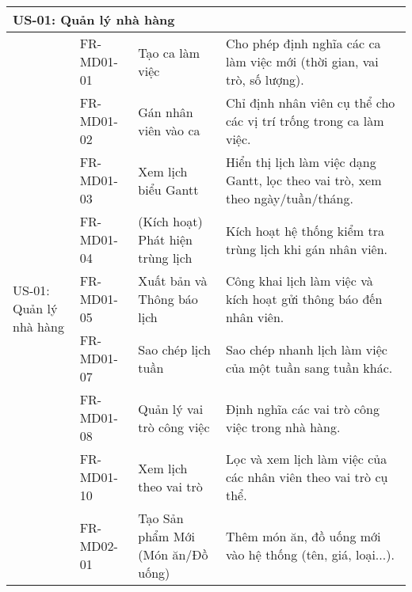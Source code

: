 \begin{longtable}{|m{2.5cm}|m{2.5cm}|m{5cm}|m{5cm}|}
	\multicolumn{4}{|l|}{\textbf{US-01: Quản lý nhà hàng}}                                                                                                                                                                                 \\ \hline
	\multirow{15}{=}[2pt]{US-01: Quản lý nhà hàng}          & FR-MD01-01            & Tạo ca làm việc                                        & Cho phép định nghĩa các ca làm việc mới (thời gian, vai trò, số lượng).                     \\
	                                                        & FR-MD01-02            & Gán nhân viên vào ca                                   & Chỉ định nhân viên cụ thể cho các vị trí trống trong ca làm việc.                           \\
	                                                        & FR-MD01-03            & Xem lịch biểu Gantt                                    & Hiển thị lịch làm việc dạng Gantt, lọc theo vai trò, xem theo ngày/tuần/tháng.              \\
	                                                        & FR-MD01-04            & (Kích hoạt) Phát hiện trùng lịch                       & Kích hoạt hệ thống kiểm tra trùng lịch khi gán nhân viên.                                   \\
	                                                        & FR-MD01-05            & Xuất bản và Thông báo lịch                             & Công khai lịch làm việc và kích hoạt gửi thông báo đến nhân viên.                           \\
	                                                        & FR-MD01-07            & Sao chép lịch tuần                                     & Sao chép nhanh lịch làm việc của một tuần sang tuần khác.                                   \\
	                                                        & FR-MD01-08            & Quản lý vai trò công việc                              & Định nghĩa các vai trò công việc trong nhà hàng.                                            \\
	                                                        & FR-MD01-10            & Xem lịch theo vai trò                                  & Lọc và xem lịch làm việc của các nhân viên theo vai trò cụ thể.                             \\ \cline{2-4}
	                                                        & FR-MD02-01            & Tạo Sản phẩm Mới (Món ăn/Đồ uống)                      & Thêm món ăn, đồ uống mới vào hệ thống (tên, giá, loại...).                                  \\

\end{longtable}
